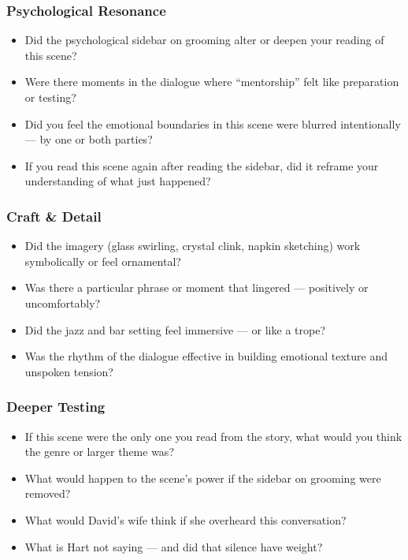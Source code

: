 \subsubsection{Psychological Resonance}

\begin{itemize}
\item Did the psychological sidebar on grooming alter or deepen your reading of this scene?
\item Were there moments in the dialogue where “mentorship” felt like preparation or testing?
\item Did you feel the emotional boundaries in this scene were blurred intentionally — by one or both parties?
\item If you read this scene again after reading the sidebar, did it reframe your understanding of what just happened?
\end{itemize}

\subsubsection{Craft \& Detail}

\begin{itemize}
\item Did the imagery (glass swirling, crystal clink, napkin sketching) work symbolically or feel ornamental?
\item Was there a particular phrase or moment that lingered — positively or uncomfortably?
\item Did the jazz and bar setting feel immersive — or like a trope?
\item Was the rhythm of the dialogue effective in building emotional texture and unspoken tension?
\end{itemize}

\subsubsection{Deeper Testing}

\begin{itemize}
\item If this scene were the only one you read from the story, what would you think the genre or larger theme was?
\item What would happen to the scene’s power if the sidebar on grooming were removed?
\item What would David’s wife think if she overheard this conversation?
\item What is Hart not saying — and did that silence have weight?
\end{itemize}



